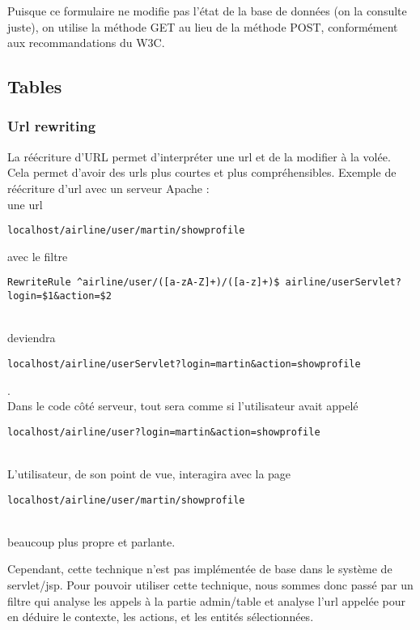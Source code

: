 Puisque ce formulaire ne modifie pas l'état de la base de données (on la consulte juste), on utilise la méthode GET au lieu de la méthode POST, conformément aux recommandations du W3C.

\subsection{Tables}

\subsubsection{Url rewriting}
La réécriture d'URL permet d'interpréter une url et de la modifier à la volée. Cela permet d'avoir des urls plus courtes et plus compréhensibles. Exemple de réécriture d'url avec un serveur Apache :
~\\
une url 
\begin{footnotesize}\verb|localhost/airline/user/martin/showprofile|\end{footnotesize} avec le filtre \\
\begin{footnotesize}\verb|RewriteRule ^airline/user/([a-zA-Z]+)/([a-z]+)$ airline/userServlet?login=$1&action=$2|\end{footnotesize}\\
 deviendra \begin{footnotesize}\verb|localhost/airline/userServlet?login=martin&action=showprofile|\end{footnotesize}.\\
Dans le code côté serveur, tout sera comme si l'utilisateur avait appelé \\
\begin{footnotesize}\verb|localhost/airline/user?login=martin&action=showprofile|\end{footnotesize}\\
L'utilisateur, de son point de vue, interagira avec la page \\
\begin{footnotesize}\verb|localhost/airline/user/martin/showprofile|\end{footnotesize}
\\
beaucoup plus propre et parlante.

Cependant, cette technique n'est pas implémentée de base dans le système de servlet/jsp. Pour pouvoir utiliser cette technique, nous sommes donc passé par un filtre qui analyse les appels à la partie admin/table et analyse l'url appelée pour en déduire le contexte, les actions, et les entités sélectionnées.

